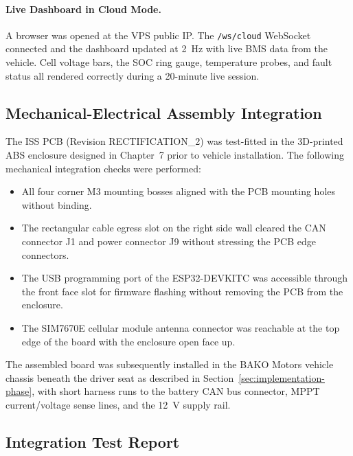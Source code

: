 \paragraph{Live Dashboard in Cloud Mode.}
A browser was opened at the VPS public IP\@. The \texttt{/ws/cloud} WebSocket connected and the dashboard updated at 2~Hz with live BMS data from the vehicle. Cell voltage bars, the SOC ring gauge, temperature probes, and fault status all rendered correctly during a 20-minute live session.

\subsection{Mechanical-Electrical Assembly Integration}

The ISS PCB (Revision RECTIFICATION\_2) was test-fitted in the 3D-printed ABS enclosure designed in Chapter~7 prior to vehicle installation. The following mechanical integration checks were performed:

\begin{itemize}
    \item All four corner M3 mounting bosses aligned with the PCB mounting holes without binding.
    \item The rectangular cable egress slot on the right side wall cleared the CAN connector J1 and power connector J9 without stressing the PCB edge connectors.
    \item The USB programming port of the ESP32-DEVKITC was accessible through the front face slot for firmware flashing without removing the PCB from the enclosure.
    \item The SIM7670E cellular module antenna connector was reachable at the top edge of the board with the enclosure open face up.
\end{itemize}

The assembled board was subsequently installed in the BAKO Motors vehicle chassis beneath the driver seat as described in Section~\ref{sec:implementation-phase}, with short harness runs to the battery CAN bus connector, MPPT current/voltage sense lines, and the 12~V supply rail.

\subsection{Integration Test Report}

